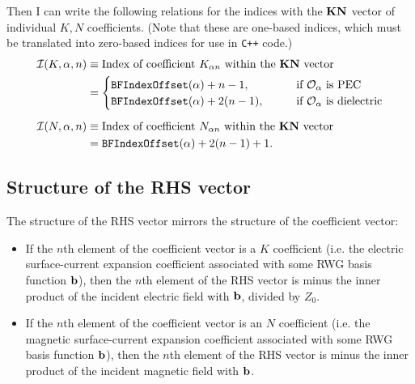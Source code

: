 \documentclass[letterpaper]{article}
\begin{document}
Then I can write the following relations for the indices 
with the $\mathbf{KN}$ vector of individual $K, N$ coefficients.
(Note that these are one-based indices, which must be translated
into zero-based indices for use in \texttt{C++} code.)
\begin{align*}
\mathcal{I}(K, \alpha, n)
&\equiv \text{Index of coefficient $K_{\alpha n}$
              within the $\mathbf{KN}$ vector}
\\
&=\begin{cases}
   \texttt{BFIndexOffset}(\alpha) + n-1, 
   \qquad &\text{if $\mathcal{O}_\alpha$ is PEC} \\
   \texttt{BFIndexOffset}(\alpha) + 2(n-1),
   \qquad &\text{if $\mathcal{O}_\alpha$ is dielectric}
  \end{cases}
\\[5pt]
\mathcal{I}(N, \alpha, n)
&\equiv \text{Index of coefficient $N_{\alpha n}$ 
              within the $\mathbf{KN}$ vector}
\\
&=\texttt{BFIndexOffset}(\alpha) + 2(n-1)+1.
\end{align*}

\subsection{Structure of the RHS vector}

The structure of the RHS vector mirrors the structure of 
the coefficient vector: 

\begin{itemize}
 \item If the $n$th element of the coefficient vector is a $K$ 
       coefficient (i.e. the electric surface-current expansion 
       coefficient associated with some RWG basis function $\mathbf{b}$), 
       then the $n$th element of the RHS vector is minus the 
       inner product of the incident electric field with $\mathbf{b}$,
       divided by $Z_0$.
 \item If the $n$th element of the coefficient vector is an $N$ 
       coefficient (i.e. the magnetic surface-current expansion 
       coefficient associated with some RWG basis function $\mathbf{b}$),
       then the $n$th element of the RHS vector is minus the 
       inner product of the incident magnetic field with $\mathbf{b}$.
\end{itemize}
\end{document}
